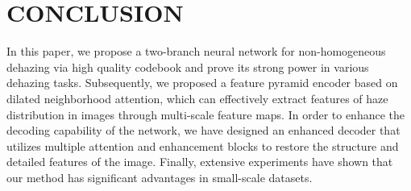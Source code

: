 \documentclass[lettersize,journal]{IEEEtran}
\begin{document}
\section{CONCLUSION}
In this paper, we propose a two-branch neural network for non-homogeneous dehazing via high quality codebook and prove its strong power in various dehazing tasks. Subsequently, we proposed a feature pyramid encoder based on dilated neighborhood attention, which can effectively extract features of haze distribution in images through multi-scale feature maps. In order to enhance the decoding capability of the network, we have designed an enhanced decoder that utilizes multiple attention and enhancement blocks to restore the structure and detailed features of the image. Finally, extensive experiments have shown that our method has significant advantages in small-scale datasets.



{}
\end{document}
